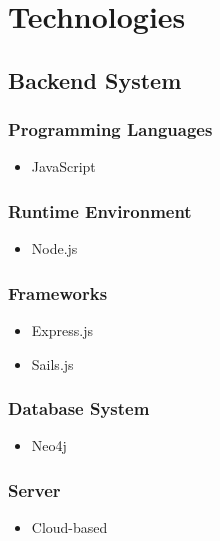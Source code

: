 \documentclass[11pt,fleqn]{book} %
\begin{document}
	


\chapter{Technologies}

	\section{Backend System}
		\subsection{Programming Languages}
			\begin{itemize}
				\item JavaScript
			\end{itemize}
		\subsection{Runtime Environment}
			\begin{itemize}
				\item Node.js
			\end{itemize}
		\subsection{Frameworks}
			\begin{itemize}
				\item Express.js
				\item Sails.js
			\end{itemize}
		\subsection{Database System}
			\begin{itemize}
				\item Neo4j
			\end{itemize}
		\subsection{Server}
			\begin{itemize}
				\item Cloud-based
			\end{itemize}
\end{document}
